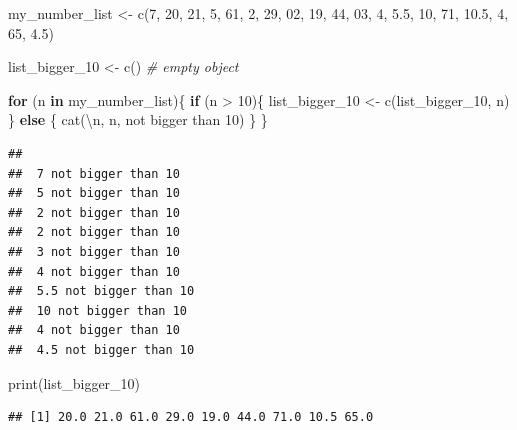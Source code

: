 \documentclass[
]{book}
\newenvironment{Shaded}{\begin{snugshade}}{\end{snugshade}}
\newcommand{\CommentTok}[1]{\textcolor[rgb]{0.56,0.35,0.01}{\textit{#1}}}
\newcommand{\ControlFlowTok}[1]{\textcolor[rgb]{0.13,0.29,0.53}{\textbf{#1}}}
\newcommand{\DecValTok}[1]{\textcolor[rgb]{0.00,0.00,0.81}{#1}}
\newcommand{\FloatTok}[1]{\textcolor[rgb]{0.00,0.00,0.81}{#1}}
\newcommand{\FunctionTok}[1]{\textcolor[rgb]{0.00,0.00,0.00}{#1}}
\newcommand{\NormalTok}[1]{#1}
\newcommand{\OtherTok}[1]{\textcolor[rgb]{0.56,0.35,0.01}{#1}}
\newcommand{\SpecialCharTok}[1]{\textcolor[rgb]{0.00,0.00,0.00}{#1}}
\newcommand{\StringTok}[1]{\textcolor[rgb]{0.31,0.60,0.02}{#1}}
\begin{document}
\begin{Shaded}
\begin{Highlighting}[]
\NormalTok{my\_number\_list }\OtherTok{\textless{}{-}} \FunctionTok{c}\NormalTok{(}\DecValTok{7}\NormalTok{, }\DecValTok{20}\NormalTok{, }\DecValTok{21}\NormalTok{, }\DecValTok{5}\NormalTok{, }\DecValTok{61}\NormalTok{, }\DecValTok{2}\NormalTok{, }\DecValTok{29}\NormalTok{, }\DecValTok{02}\NormalTok{, }\DecValTok{19}\NormalTok{, }\DecValTok{44}\NormalTok{,}
                    \DecValTok{03}\NormalTok{, }\DecValTok{4}\NormalTok{, }\FloatTok{5.5}\NormalTok{, }\DecValTok{10}\NormalTok{, }\DecValTok{71}\NormalTok{, }\FloatTok{10.5}\NormalTok{, }\DecValTok{4}\NormalTok{, }\DecValTok{65}\NormalTok{, }\FloatTok{4.5}\NormalTok{)}

\NormalTok{list\_bigger\_10 }\OtherTok{\textless{}{-}} \FunctionTok{c}\NormalTok{() }\CommentTok{\# empty object }

\ControlFlowTok{for}\NormalTok{ (n }\ControlFlowTok{in}\NormalTok{ my\_number\_list)\{}
  \ControlFlowTok{if}\NormalTok{ (n }\SpecialCharTok{\textgreater{}} \DecValTok{10}\NormalTok{)\{}
\NormalTok{    list\_bigger\_10 }\OtherTok{\textless{}{-}} \FunctionTok{c}\NormalTok{(list\_bigger\_10, n)}
\NormalTok{  \} }\ControlFlowTok{else}\NormalTok{ \{}
    \FunctionTok{cat}\NormalTok{(}\StringTok{\textquotesingle{}}\SpecialCharTok{\textbackslash{}n}\StringTok{\textquotesingle{}}\NormalTok{, n, }\StringTok{\textquotesingle{}not bigger than 10\textquotesingle{}}\NormalTok{)}
\NormalTok{  \}}
\NormalTok{\}}
\end{Highlighting}
\end{Shaded}

\begin{verbatim}
## 
##  7 not bigger than 10
##  5 not bigger than 10
##  2 not bigger than 10
##  2 not bigger than 10
##  3 not bigger than 10
##  4 not bigger than 10
##  5.5 not bigger than 10
##  10 not bigger than 10
##  4 not bigger than 10
##  4.5 not bigger than 10
\end{verbatim}

\begin{Shaded}
\begin{Highlighting}[]
\FunctionTok{print}\NormalTok{(list\_bigger\_10)}
\end{Highlighting}
\end{Shaded}

\begin{verbatim}
## [1] 20.0 21.0 61.0 29.0 19.0 44.0 71.0 10.5 65.0
\end{verbatim}
\end{document}
